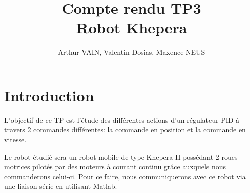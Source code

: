 \documentclass[a4paper]{article}
\begin{document}
	\title{\large{\textbf{Compte rendu TP3}}\\ Robot Khepera}
	\author{Arthur VAIN, Valentin Dosias, Maxence NEUS}
	\date{}
	
	\maketitle	
	\tableofcontents
	\newpage
	
	\section{Introduction}
	L'objectif de ce TP est l'étude des différentes actions d'un régulateur PID à travers 2 commandes différentes: la commande en position et la commande en vitesse.
	
	Le robot étudié sera un robot mobile de type Khepera II possédant 2 roues motrices pilotés par des moteurs à courant continu grâce auxquels nous commanderons celui-ci.
	Pour ce faire, nous communiquerons avec ce robot via une liaison série en utilisant Matlab.
	
\end{document}
